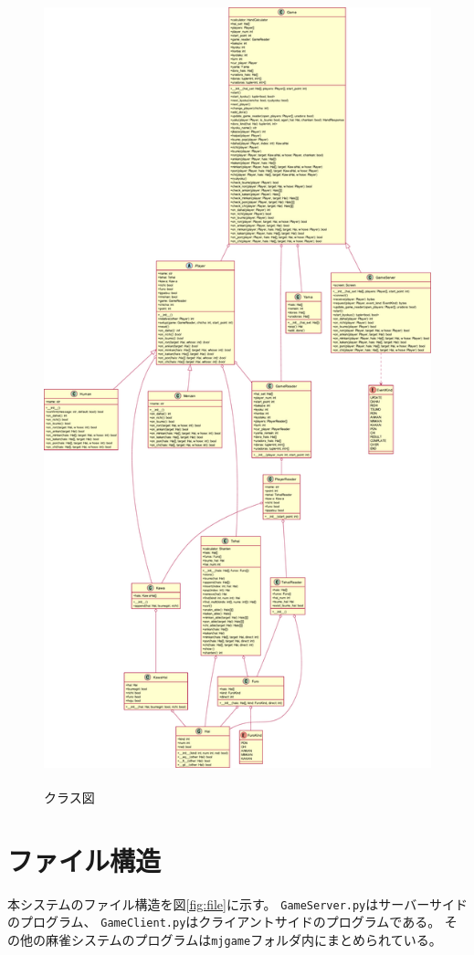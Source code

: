 \documentclass[a4j,titlepage]{jsarticle}
\begin{document}
\begin{figure}[p]
  \centering
  \includegraphics[height=23cm]{images/mahjong.pdf}
  \caption{クラス図}
  \label{fig:class}
\end{figure}


\section{ファイル構造}
本システムのファイル構造を図\ref{fig:file}に示す。
\texttt{GameServer.py}はサーバーサイドのプログラム、
\texttt{GameClient.py}はクライアントサイドのプログラムである。
その他の麻雀システムのプログラムは\texttt{mjgame}フォルダ内にまとめられている。
\end{document}
